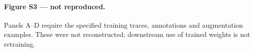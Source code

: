 \paragraph{Figure S3 --- not reproduced.} Panels A--D require the specified training traces, annotations and augmentation examples. These were not reconstructed; downstream use of trained weights is not retraining.
